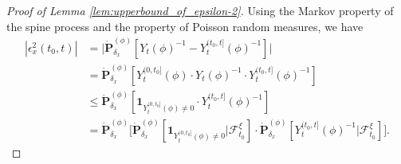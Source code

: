 \documentclass[12pt,a4paper]{amsart}
\theoremstyle{definition}
\numberwithin{equation}{section}
\begin{document}
\begin{proof}
  [Proof of Lemma \ref{lem:upperbound_of_epsilon-2}]
Using the Markov property of the spine process and the property of Poisson random measures, we have
\begin{align}\label{eq:epsilon-2}
	|\epsilon_x^2(t_0,t)|
	&= \big| \dot{\mathbf P}_{\delta_x}^{(\phi)}[Y_t(\phi)^{-1} - Y^{(t_0,t]}_t(\phi)^{-1}] \big|
	\\&= \dot{\mathbf P}_{\delta_x}^{(\phi)}[Y_t^{(0,t_0]}(\phi)\cdot Y_t(\phi)^{-1}\cdot Y^{(t_0,t]}_t(\phi)^{-1}]
	\\&\leq \dot{\mathbf P}_{\delta_x}^{(\phi)}[\mathbf 1_{Y_t^{(0,t_0]}(\phi)\neq 0}\cdot Y^{(t_0,t]}_t(\phi)^{-1}]
	\\&= \dot{\mathbf P}_{\delta_x}^{(\phi)} \big[\dot{\mathbf P}_{\delta_x}^{(\phi)}[\mathbf 1_{Y_t^{(0,t_0]}(\phi)\neq 0}|\mathscr F^\xi_{t_0}] \cdot \dot{\mathbf P}_{\delta_x}^{(\phi)} [ Y^{(t_0,t]}_t(\phi)^{-1}|\mathscr F^\xi_{t_0}] \big].
\end{align}


\end{proof}
\end{document}

